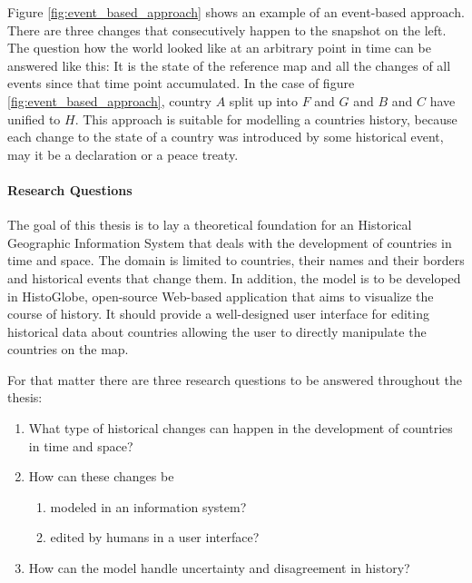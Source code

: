 Figure \ref{fig:event_based_approach} shows an example of an event-based approach. There are three changes that consecutively happen to the snapshot on the left. The question how the world looked like at an arbitrary point in time can be answered like this: It is the state of the reference map and all the changes of all events since that time point accumulated. In the case of figure \ref{fig:event_based_approach}, country $A$ split up into $F$ and $G$ and $B$ and $C$ have unified to $H$. This approach is suitable for modelling a countries history, because each change to the state of a country was introduced by some historical event, may it be a declaration or a peace treaty.

\paragraph{Research Questions} %
\label{par:research_questions}

The goal of this thesis is to lay a theoretical foundation for an Historical Geographic Information System that deals with the development of countries in time and space. The domain is limited to countries, their names and their borders and historical events that change them. In addition, the model is to be developed in HistoGlobe, open-source Web-based application that aims to visualize the course of history. It should provide a well-designed user interface for editing historical data about countries allowing the user to directly manipulate the countries on the map.

For that matter there are three research questions to be answered throughout the thesis:

\begin{enumerate}
  \item What type of historical changes can happen in the development of countries in time and space?
  \item How can these changes be
  \begin{enumerate}
    \item modeled in an information system?
    \item edited by humans in a user interface?
  \end{enumerate}
  \item How can the model handle uncertainty and disagreement in history?
\end{enumerate}


